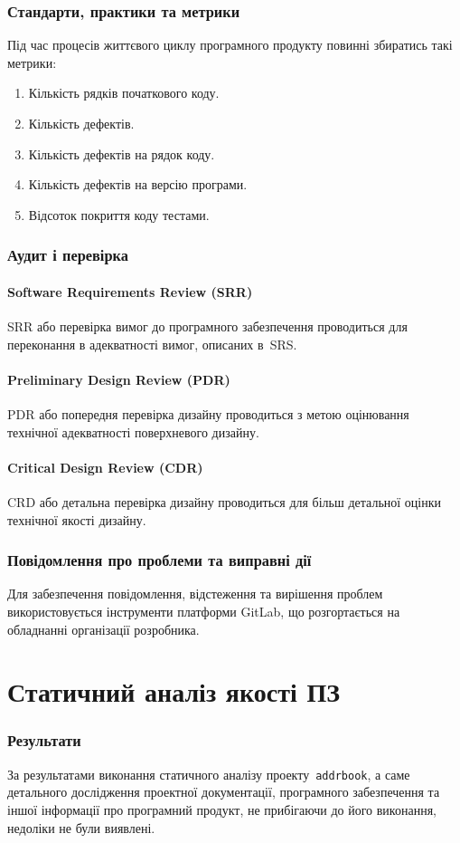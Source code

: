 \documentclass[a4paper,oneside,DIV=12,12pt]{scrartcl}
\newcommand{\progname}{\texttt{addrbook}}
\begin{document}
			\section{Стандарти, практики та метрики}
				Під час процесів життєвого циклу програмного продукту повинні збиратись такі метрики:
				\begin{enumerate}
					\item Кількість рядків початкового коду.
					\item Кількість дефектів.
					\item Кількість дефектів на рядок коду.
					\item Кількість дефектів на версію програми.
					\item Відсоток покриття коду тестами.
				\end{enumerate}
				
			\section{Аудит і перевірка}
				\subsection{Software Requirements Review (SRR)}
					SRR або перевірка вимог до програмного забезпечення проводиться для переконання в адекватності вимог, описаних в~SRS.
					
				\subsection{Preliminary Design Review (PDR)}
					PDR або попередня перевірка дизайну проводиться з метою оцінювання технічної адекватності поверхневого дизайну.
					
				\subsection{Critical Design Review (CDR)}
					CRD або детальна перевірка дизайну проводиться для більш детальної оцінки технічної якості дизайну.
					
			\section{Повідомлення про проблеми та виправні дії}
				Для забезпечення повідомлення, відстеження та вирішення проблем використовується інструменти платформи GitLab, що розгортається на обладнанні організації розробника.
					
	\part{Статичний аналіз якості ПЗ}
		\section{Результати}
			За результатами виконання статичного аналізу проекту~\progname , а саме детального дослідження проектної документації, програмного забезпечення та іншої інформації про програмний продукт, не прибігаючи до його виконання, недоліки не були виявлені.
\end{document}
